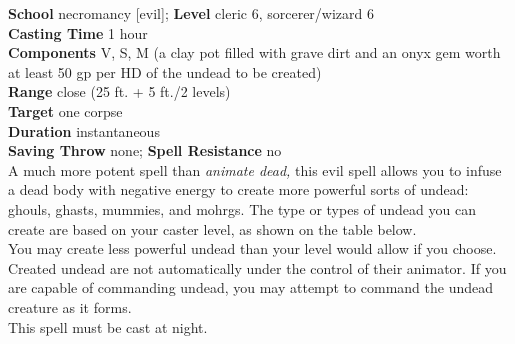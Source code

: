 \textbf{School} necromancy [evil]; \textbf{Level} cleric 6, sorcerer/wizard 6\\
\textbf{Casting Time} 1 hour\\
\textbf{Components} V, S, M (a clay pot filled with grave dirt and an onyx gem worth at least 50 gp per HD of the undead to be created)\\
\textbf{Range} close (25 ft. + 5 ft./2 levels)\\
\textbf{Target} one corpse\\
\textbf{Duration} instantaneous\\
\textbf{Saving Throw} none; \textbf{Spell Resistance} no\\
A much more potent spell than \textit{animate dead, }this evil spell allows you to infuse a dead body with negative energy to create more powerful sorts of undead: ghouls, ghasts, mummies, and mohrgs. The type or types of undead you can create are based on your caster level, as shown on the table below.\\
You may create less powerful undead than your level would allow if you choose. Created undead are not automatically under the control of their animator. If you are capable of commanding undead, you may attempt to command the undead creature as it forms.\\
This spell must be cast at night.\\
